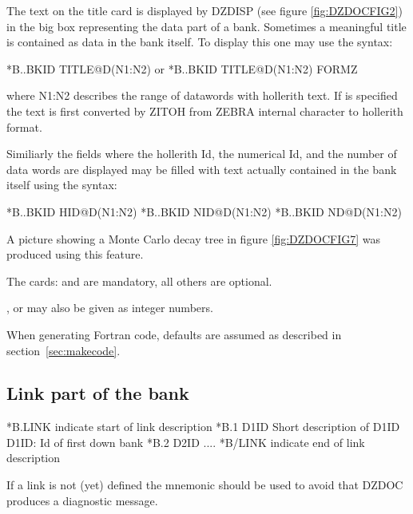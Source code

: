 \begin{Notes}
\item The text on the title card  is displayed by DZDISP
      (see figure \ref{fig:DZDOCFIG2})
      in the big box representing the data part of a bank. Sometimes  a
      meaningful title is contained as data in the bank itself.
      To display this one may use the syntax:
\begin{XMP}
*B..BKID  TITLE@D(N1:N2)
  or
*B..BKID  TITLE@D(N1:N2) FORMZ
\end{XMP}
      where N1:N2 describes the range of datawords with hollerith text.
      If  is specified the text is first converted by ZITOH
      from ZEBRA internal character to hollerith format. 
      
      Similiarly the fields where the hollerith Id, the numerical Id,
      and the number of data words are displayed may be filled with text
      actually contained in the bank itself using the syntax:
\begin{XMP}
*B..BKID  HID@D(N1:N2)
*B..BKID  NID@D(N1:N2)
*B..BKID  ND@D(N1:N2)
\end{XMP}
 
A picture showing a Monte Carlo decay tree 
in figure \ref{fig:DZDOCFIG7} was produced using this feature.
 
\item The cards:  and  are mandatory, all others are optional. 
\item {},  or  may also be given as integer numbers. 
\item When generating Fortran code,
      defaults are assumed as described in section~\ref{sec:makecode}.
\end{Notes}
 
\subsection{Link part of the bank}
 
\begin{XMP}
*B.LINK            \lcb indicate start of link description\rcb 
*B.1      D1ID     Short description of D1ID  \lcb D1ID: Id of first down bank\rcb 
*B.2      D2ID     ....
*B/LINK            \lcb indicate end of link description\rcb 
\end{XMP}
 
If a link is not (yet) defined  the mnemonic  should be used
to avoid that DZDOC produces a diagnostic message.
 
